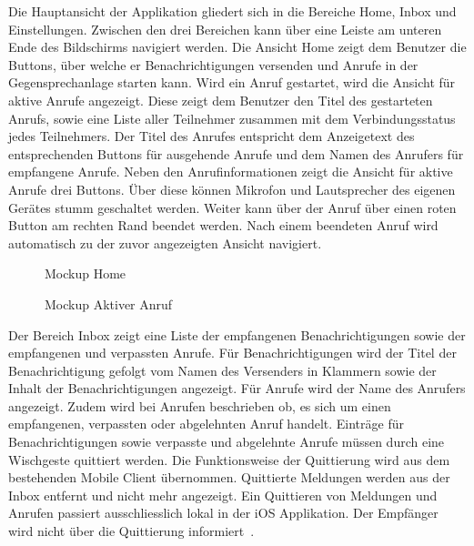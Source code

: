 Die Hauptansicht der Applikation gliedert sich in die Bereiche Home, Inbox und Einstellungen.
Zwischen den drei Bereichen kann über eine Leiste am unteren Ende des Bildschirms navigiert werden.
Die Ansicht Home zeigt dem Benutzer die Buttons, über welche er Benachrichtigungen versenden und Anrufe in der Gegensprechanlage starten kann.
Wird ein Anruf gestartet, wird die Ansicht für aktive Anrufe angezeigt.
Diese zeigt dem Benutzer den Titel des gestarteten Anrufs, sowie eine Liste aller Teilnehmer zusammen mit dem Verbindungsstatus jedes Teilnehmers.
Der Titel des Anrufes entspricht dem Anzeigetext des entsprechenden Buttons für ausgehende Anrufe und dem Namen des Anrufers für empfangene Anrufe.
Neben den Anrufinformationen zeigt die Ansicht für aktive Anrufe drei Buttons.
Über diese können Mikrofon und Lautsprecher des eigenen Gerätes stumm geschaltet werden.
Weiter kann über der Anruf über einen roten Button am rechten Rand beendet werden.
Nach einem beendeten Anruf wird automatisch zu der zuvor angezeigten Ansicht navigiert.

\begin{figure}[h]
    \centering
    \begin{minipage}[b]{0.4\textwidth}
        \caption{Mockup Home}
    \end{minipage}
    \hfill
    \begin{minipage}[b]{0.4\textwidth}
        \caption{Mockup Aktiver Anruf}
    \end{minipage}\label{fig:Mockups-Home-ActiveCall}
\end{figure}

Der Bereich Inbox zeigt eine Liste der empfangenen Benachrichtigungen sowie der empfangenen und verpassten Anrufe.
Für Benachrichtigungen wird der Titel der Benachrichtigung gefolgt vom Namen des Versenders in Klammern sowie der Inhalt der Benachrichtigungen angezeigt.
Für Anrufe wird der Name des Anrufers angezeigt. 
Zudem wird bei Anrufen beschrieben ob, es sich um einen empfangenen, verpassten oder abgelehnten Anruf handelt.
Einträge für Benachrichtigungen sowie verpasste und abgelehnte Anrufe müssen durch eine Wischgeste quittiert werden.
Die Funktionsweise der Quittierung wird aus dem bestehenden Mobile Client übernommen.
Quittierte Meldungen werden aus der Inbox entfernt und nicht mehr angezeigt.
Ein Quittieren von Meldungen und Anrufen passiert ausschliesslich lokal in der iOS Applikation.
Der Empfänger wird nicht über die Quittierung informiert~\cite{ip5}.

